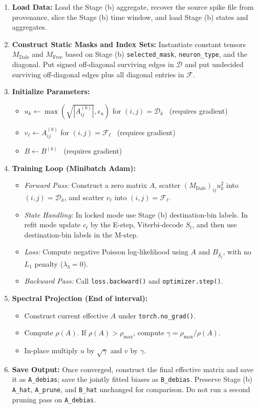 \documentclass[11pt]{article}
\begin{document}
\begin{enumerate}
    \item \textbf{Load Data:} Load the Stage (b) aggregate, recover the source
    spike file from provenance, slice the Stage (b) time window, and load
    Stage (b) states and aggregates.
    \item \textbf{Construct Static Masks and Index Sets:} Instantiate constant tensors $M_{\text{Dale}}$ and $M_{\text{Free}}$ based on Stage (b) \texttt{selected\_mask}, \texttt{neuron\_type}, and the diagonal. Put signed off-diagonal surviving edges in $\mathcal{D}$ and put undecided surviving off-diagonal edges plus all diagonal entries in $\mathcal{F}$.
    \item \textbf{Initialize Parameters:}
    \begin{itemize}
        \item $u_k \leftarrow \max(\sqrt{|A^{(b)}_{ij}|},\epsilon_u)$ for $(i,j)=\mathcal{D}_k$ \ (requires gradient)
        \item $v_\ell \leftarrow A^{(b)}_{ij}$ for $(i,j)=\mathcal{F}_\ell$ \ (requires gradient)
        \item $B \leftarrow B^{(b)}$ \ (requires gradient)
    \end{itemize}
    \item \textbf{Training Loop (Minibatch Adam):}
    \begin{itemize}
        \item \textit{Forward Pass:} Construct a zero matrix $A$, scatter $(M_{\text{Dale}})_{ij}u_k^2$ into $(i,j)=\mathcal{D}_k$, and scatter $v_\ell$ into $(i,j)=\mathcal{F}_\ell$.
        \item \textit{State Handling:} In locked mode use Stage (b) destination-bin labels. In refit mode update $c_t$ by the E-step, Viterbi-decode $S_t$, and then use destination-bin labels in the M-step.
        \item \textit{Loss:} Compute negative Poisson log-likelihood using $A$ and $B_{\hat{S}_t}$, with no $L_1$ penalty ($\lambda_3 = 0$).
        \item \textit{Backward Pass:} Call \texttt{loss.backward()} and \texttt{optimizer.step()}.
    \end{itemize}
    \item \textbf{Spectral Projection (End of interval):}
    \begin{itemize}
        \item Construct current effective $A$ under \texttt{torch.no\_grad()}.
        \item Compute $\rho(A)$. If $\rho(A) > \rho_{\text{max}}$, compute $\gamma = \rho_{\text{max}} / \rho(A)$.
        \item In-place multiply $u$ by $\sqrt{\gamma}$ and $v$ by $\gamma$.
    \end{itemize}
    \item \textbf{Save Output:} Once converged, construct the final effective matrix and save it as \texttt{A\_debias}; save the jointly fitted biases as \texttt{B\_debias}. Preserve Stage (b) \texttt{A\_hat}, \texttt{A\_prune}, and \texttt{B\_hat} unchanged for comparison. Do not run a second pruning pass on \texttt{A\_debias}.
\end{enumerate}
\end{document}
